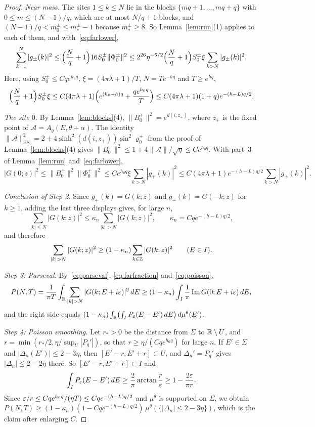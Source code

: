 \begin{proof}
\emph{Near mass.} The sites $1\le k\le N$ lie in the blocks $\{mq+1,\dots,mq+q\}$ with $0\le m\le(N-1)/q$, which are at most $N/q+1$ blocks, and $(N-1)/q<m_0^\pm\le m_*^\pm-1$ because $m_*^\pm\ge8$. So Lemma~\ref{lem:run}(1) applies to each of them, and with~\eqref{eq:farlower},
\[
\sum_{k=1}^N|g_\pm(k)|^2\le\Bigl(\frac Nq+1\Bigr)16S_0^\pm\|\Phi_0^\pm\|^2\le2^{26}\eta^{-5/2}\Bigl(\frac Nq+1\Bigr)S_0^\pm\xi\sum_{k>N}|g_\pm(k)|^2 .
\]
Here, using $S_0^\pm\le Cqe^{h_0q}$, $\xi=(4\pi\lambda+1)/T$, $N=Te^{-hq}$ and $T\ge e^{hq}$,
\[
\Bigl(\frac Nq+1\Bigr)S_0^\pm\xi\le C(4\pi\lambda+1)\Bigl(e^{(h_0-h)q}+\frac{qe^{h_0q}}T\Bigr)\le C(4\pi\lambda+1)(1+q)e^{-(h-L)q/2}.
\]

\emph{The site $0$.} By Lemma~\ref{lem:blocks}(4), $\|B_0^+\|^2=e^{d(i,z_+)}$, where $z_+$ is the fixed point of $\mathcal A=A_q(E,\theta+\alpha)$. The identity $\|\mathcal A\|_{\mathrm{HS}}^2=2+4\sinh^2(d(i,z_+))\sin^2\varrho_0^+$ from the proof of Lemma~\ref{lem:blocks}(4) gives $\|B_0^+\|^2\le1+4\|\mathcal A\|/\sqrt\eta\le Ce^{h_0q}$. With part~3 of Lemma~\ref{lem:run} and~\eqref{eq:farlower},
\[
|G(0;z)|^2\le\|B_0^+\|^2\|\Phi_0^+\|^2\le Ce^{h_0q}\xi\sum_{k>N}|g_+(k)|^2\le C(4\pi\lambda+1)e^{-(h-L)q/2}\sum_{k>N}|g_+(k)|^2 .
\]

\emph{Conclusion of Step 2.} Since $g_+(k)=G(k;z)$ and $g_-(k)=G(-k;z)$ for $k\ge1$, adding the last three displays gives, for large $n$,
\[
\sum_{|k|\le N}|G(k;z)|^2\le\kappa_n\sum_{|k|>N}|G(k;z)|^2,\qquad\kappa_n=Cqe^{-(h-L)q/2},
\]
and therefore
\begin{equation}\label{eq:farfraction}
\sum_{|k|>N}|G(k;z)|^2\ge(1-\kappa_n)\sum_{k\in\Z}|G(k;z)|^2\qquad(E\in I).
\end{equation}

\emph{Step 3: Parseval.} By~\eqref{eq:parseval}, \eqref{eq:farfraction} and~\eqref{eq:poisson},
\[
P(N,T)=\frac1{\pi T}\int_\R\sum_{|k|>N}|G(k;E+i\eps)|^2\,dE\ge(1-\kappa_n)\int_I\frac1\pi\operatorname{Im}G(0;E+i\eps)\,dE ,
\]
and the right side equals $(1-\kappa_n)\int_\mathbb R\bigl(\int_IP_\varepsilon(E-E')\,dE\bigr)\,d\mu^\theta(E')$.

\emph{Step 4: Poisson smoothing.} Let $r_*>0$ be the distance from $\Sigma$ to $\mathbb R\setminus U$, and $r=\min(r_*/2,\eta/\sup_U|P_q'|)$, so that $r\ge\eta/(Cqe^{h_0q})$ for large $n$. If $E'\in\Sigma$ and $|\Delta_n(E')|\le2-3\eta$, then $[E'-r,E'+r]\subset U$, and $\Delta_n'=P_q'$ gives $|\Delta_n|\le2-2\eta$ there. So $[E'-r,E'+r]\subset I$ and
\[
\int_IP_\varepsilon(E-E')\,dE\ge\frac2\pi\arctan\frac r{\varepsilon}\ge1-\frac{2\varepsilon}{\pi r} .
\]
Since $\varepsilon/r\le Cqe^{h_0q}/(\eta T)\le Cqe^{-(h-L)q/2}$ and $\mu^\theta$ is supported on $\Sigma$, we obtain $P(N,T)\ge(1-\kappa_n)(1-Cqe^{-(h-L)q/2})\,\mu^\theta(\{|\Delta_n|\le2-3\eta\})$, which is the claim after enlarging $C$.
\end{proof}

